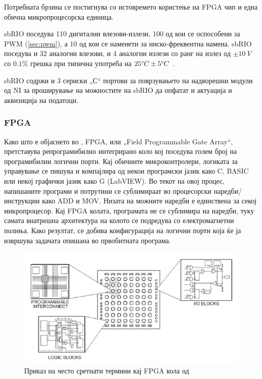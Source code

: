 \documentclass[11pt]{article}
\begin{document}
	  Потребната брзина се постигнува со истовремето користење на FPGA чип и една обична микропроцесорска единица.

	  sbRIO поседува 110 дигитални влезови-излези, 100 од кои се оспособени за PWM (\ref{sec:pwm}), а 10 од кои се наменети за ниско-фреквентна намена. sbRIO поседува и 32 аналогни влезови, и 4 аналогни излези со ранг на излез од $ \pm 10\ V$ со $0.1\%$ грешка при типична употреба на $25\degree C \pm5\degree C$ \cite{sbrio}.

	  sbRIO содржи и 3 сериски „С“ портови за поврзувањето на надворешни модули од NI за проширување на можностите на sbRIO да опфатат и актуација и аквизиција на податоци.

	  \subsubsection{FPGA}
		  Како што е објаснето во \cite{fpga}, FPGA, или „Field Programmable Gate Array“, претставува репрограмибилно интегрирано коло кој поседува голем број на програмибилни логични порти. Кај обичните микроконтролери, логиката за управување се пишува и компајлира од некои програмски јазик како C, BASIC или некој графички јазик како G (LabVIEW). Во текот на овој процес, напишаните програми и потрутини се сублимираат во процесорски наредби/инструкции како ADD и MOV. Низата на можните наредби е единствена за секој микропроцесор. Кај FPGA колата, програмата не се сублимира на наредби, туку самата внатрешна архитектура на колото се подредува со електромагнетни полиња. Како резултат, се добива конфигурација на логични порти која ќе ја извршува задачата опишана во првобитната програма.

		  \begin{figure}[H]
			  \includegraphics[width=0.75\linewidth]{./images/fpga_diagram.jpg}
		  	\centering
		  	\caption{Приказ на често сретнати термини кај FPGA кола од \cite{experiments}}
		  	\label{fig:fpga_diagram_jpg}
		  	\end{figure}
\end{document}
